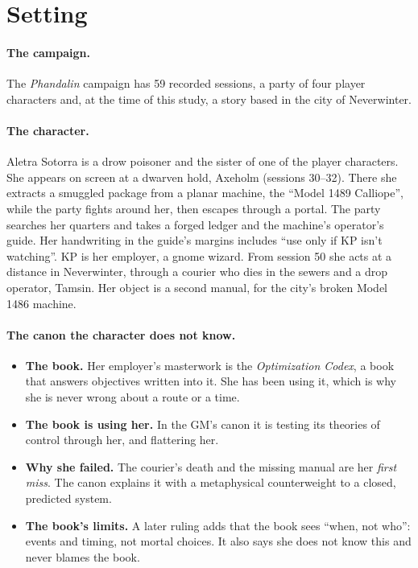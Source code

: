 \documentclass[11pt]{article}
\begin{document}
\section{Setting}
\label{sec:setting}

\paragraph{The campaign.} The \emph{Phandalin} campaign has 59 recorded sessions, a party
of four player characters and, at the time of this study, a story based in the city of
Neverwinter.

\paragraph{The character.} Aletra Sotorra is a drow poisoner and the sister of one of the
player characters. She appears on screen at a dwarven hold, Axeholm (sessions 30--32). There
she extracts a smuggled package from a planar machine, the ``Model 1489 Calliope'', while
the party fights around her, then escapes through a portal. The party searches her
quarters and takes a forged ledger and the machine's operator's guide. Her handwriting in
the guide's margins includes ``use only if KP isn't watching''. KP is her employer, a gnome
wizard. From session 50 she acts at a distance in Neverwinter, through a courier who dies
in the sewers and a drop operator, Tamsin. Her object is a second manual, for the city's
broken Model 1486 machine.

\paragraph{The canon the character does not know.}
\begin{itemize}[nosep]
\item \textbf{The book.} Her employer's masterwork is the \emph{Optimization Codex}, a book
that answers objectives written into it. She has been using it, which is why she is never
wrong about a route or a time.
\item \textbf{The book is using her.} In the GM's canon it is testing its theories of
control through her, and flattering her.
\item \textbf{Why she failed.} The courier's death and the missing manual are her
\emph{first miss}. The canon explains it with a metaphysical counterweight to a closed,
predicted system.
\item \textbf{The book's limits.} A later ruling adds that the book sees ``when, not who'':
events and timing, not mortal choices. It also says she does not know this and never
blames the book.
\end{itemize}
\end{document}
